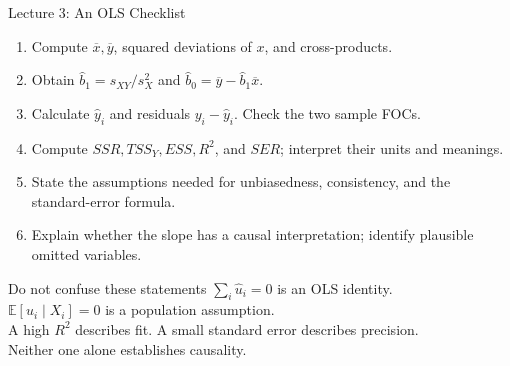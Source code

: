 \documentclass[10pt,aspectratio=169]{beamer}
\newcommand{\E}{\mathbb{E}}
\begin{document}
\begin{frame}{Lecture 3: An OLS Checklist}
\small
\begin{enumerate}
\item Compute $\overline x,\overline y$, squared deviations of $x$, and cross-products.
\item Obtain $\widehat b_1=s_{XY}/s_X^2$ and $\widehat b_0=\overline y-\widehat b_1\overline x$.
\item Calculate $\widehat y_i$ and residuals $y_i-\widehat y_i$. Check the two sample FOCs.
\item Compute $SSR,TSS_Y,ESS,R^2$, and $SER$; interpret their units and meanings.
\item State the assumptions needed for unbiasedness, consistency, and the standard-error formula.
\item Explain whether the slope has a causal interpretation; identify plausible omitted variables.
\end{enumerate}
\begin{block}{Do not confuse these statements}
$\sum_i\widehat u_i=0$ is an OLS identity.\\
$\E[u_i\mid X_i]=0$ is a population assumption.\\
A high $R^2$ describes fit. A small standard error describes precision.\\
Neither one alone establishes causality.
\end{block}
\end{frame}
\end{document}
